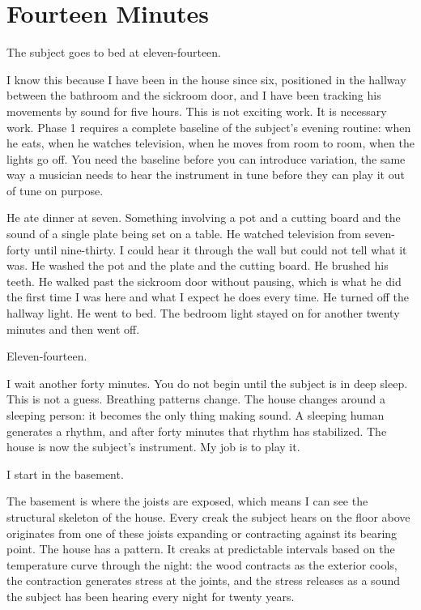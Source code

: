 
\chapter{Fourteen Minutes}

The subject goes to bed at eleven-fourteen.

I know this because I have been in the house since six, positioned in the hallway between the bathroom and the sickroom door, and I have been tracking his movements by sound for five hours. This is not exciting work. It is necessary work. Phase 1 requires a complete baseline of the subject's evening routine: when he eats, when he watches television, when he moves from room to room, when the lights go off. You need the baseline before you can introduce variation, the same way a musician needs to hear the instrument in tune before they can play it out of tune on purpose.

He ate dinner at seven. Something involving a pot and a cutting board and the sound of a single plate being set on a table. He watched television from seven-forty until nine-thirty. I could hear it through the wall but could not tell what it was. He washed the pot and the plate and the cutting board. He brushed his teeth. He walked past the sickroom door without pausing, which is what he did the first time I was here and what I expect he does every time. He turned off the hallway light. He went to bed. The bedroom light stayed on for another twenty minutes and then went off.

Eleven-fourteen.

I wait another forty minutes. You do not begin until the subject is in deep sleep. This is not a guess. Breathing patterns change. The house changes around a sleeping person: it becomes the only thing making sound. A sleeping human generates a rhythm, and after forty minutes that rhythm has stabilized. The house is now the subject's instrument. My job is to play it.

I start in the basement.

The basement is where the joists are exposed, which means I can see the structural skeleton of the house. Every creak the subject hears on the floor above originates from one of these joists expanding or contracting against its bearing point. The house has a pattern. It creaks at predictable intervals based on the temperature curve through the night: the wood contracts as the exterior cools, the contraction generates stress at the joints, and the stress releases as a sound the subject has been hearing every night for twenty years.

